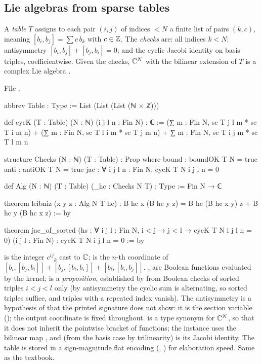 \subsection{Lie algebras from sparse tables}

\begin{definition}\label{l23:def:scalg}
A \emph{table} $T$ assigns to each pair $(i,j)$ of indices $<N$ a finite list of pairs $(k,c)$, meaning $[b_i,b_j]=\sum c\,b_k$ with
$c\in{\mathbb{Z}}$. The \emph{checks} are: all indices $k<N$; antisymmetry $[b_i,b_j]+[b_j,b_i]=0$; and the cyclic Jacobi identity on basis triples,
coefficientwise. Given the checks, ${\mathbb{C}}^N$ with the bilinear extension of $T$ is a complex Lie algebra .
\end{definition}
\noindent File .
\begin{leancode}
abbrev Table : Type := List (List (List (ℕ × ℤ)))

def cycK (T : Table) (N : ℕ) (i j l n : Fin N) : ℂ :=
  (∑ m : Fin N, sc T j l m * sc T i m n) + (∑ m : Fin N, sc T l i m * sc T j m n) +
    ∑ m : Fin N, sc T i j m * sc T l m n

structure Checks (N : ℕ) (T : Table) : Prop where
  bound : boundOK T N = true
  anti : antiOK T N = true
  jac : ∀ i j l n : Fin N, cycK T N i j l n = 0

def Alg (N : ℕ) (T : Table) (_hc : Checks N T) : Type := Fin N → ℂ

theorem leibniz (x y z : Alg N T hc) :
    B hc x (B hc y z) = B hc (B hc x y) z + B hc y (B hc x z) := by

theorem jac_of_sorted (hs : ∀ i j l : Fin N, i < j → j < l → cycK T N i j l n = 0) (i j l : Fin N) :
    cycK T N i j l n = 0 := by
\end{leancode}

\begin{dictionary}
 is the integer $c^{ij}{}_k$ cast to ${\mathbb{C}}$;  is the $n$-th coordinate of
$[b_i,[b_j,b_l]]+[b_j,[b_l,b_i]]+[b_l,[b_i,b_j]]$. ,  are Boolean functions evaluated by the kernel;
 is a \emph{proposition}, established by  from Boolean checks of sorted triples $i<j<l$ only (by
antisymmetry the cyclic sum is alternating, so sorted triples suffice, and triples with a repeated index vanish). The antisymmetry is
a hypothesis of  that the printed signature does not show: it is the section variable
 (); the output coordinate  is fixed throughout.  is a type
synonym for ${\mathbb{C}}^N$, so that it does not inherit the pointwise bracket of functions; the instance  uses the
bilinear map , and  (from the basis case by trilinearity) is its Jacobi identity. The table is stored in a
sign-magnitude flat encoding (, ) for elaboration speed. Same as the textbook.
\end{dictionary}

